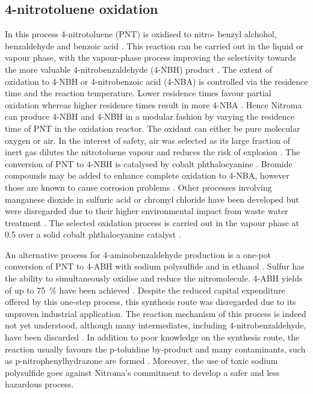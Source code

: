 \subsection{4-nitrotoluene oxidation}

In this process 4-nitrotoluene (PNT) is oxidised to nitro- benzyl alchohol, benzaldehyde and benzoic acid \cite{hoorn_modelling_2005}. This reaction can be carried out in the liquid or vapour phase, with the vapour-phase process improving the selectivity towards the more valuable 4-nitrobenzaldehyde (4-NBH) product \cite{bruhne_benzaldehyde_2011}. The extent of oxidation to 4-NBH or 4-nitrobenzoic acid (4-NBA) is controlled via the residence time and the reaction temperature. Lower residence times favour partial oxidation whereas higher residence times result in more 4-NBA \cite{bruhne_benzaldehyde_2011,tan_kinetic_2010}. Hence Nitroma can produce 4-NBH and 4-NBH in a modular fashion by varying the residence time of PNT in the oxidation reactor. The oxidant can either be pure molecular oxygen or air. In the interest of safety, air was selected as its large fraction of inert  gas dilutes the nitrotoluene vapour and reduces the risk of explosion \cite{bruhne_benzaldehyde_2011}.  The conversion of PNT to 4-NBH is catalysed by cobalt phthalocyanine \cite{wendt_reaction_1986}. Bromide compounds may be added to enhance complete oxidation to 4-NBA, however those are known to cause corrosion problems \cite{opgrande_benzoic_2003}. Other processes involving manganese dioxide in sulfuric acid or chromyl chloride have been developed but were disregarded due to their higher environmental impact from waste water treatment \cite{bruhne_benzaldehyde_2011}. The selected oxidation process is carried out in the vapour phase at \SI{0.5}{\atm} over a solid cobalt phthalocyanine catalyst \cite{chandalia_kinetics_1999}. 

An alternative process for 4-aminobenzaldehyde production is a one-pot conversion of PNT to 4-ABH with sodium polysulfide and  in ethanol \cite{ogata_mechanism_1979}. Sulfur has the ability to simultaneously oxidise and reduce the nitromolecule. 4-ABH yields of up to \SI{75}{\percent} have been achieved \cite{beard_preparation_1944}. Despite the reduced capital expenditure offered by this one-step process, this synthesis route was disregarded due to its unproven industrial application. The reaction mechanism of this process is indeed not yet understood, although many intermediates, including 4-nitrobenzaldehyde, have been discarded \cite{ogata_mechanism_1979}. In addition to poor knowledge on the synthesis route, the reaction usually favours the p-toluidine by-product and many contaminants, such as p-nitrophenylhydrazone are formed \cite{beard_preparation_1944}. Moreover, the use of toxic sodium polysulfide goes against Nitroma's commitment to develop a safer and less hazardous process.

